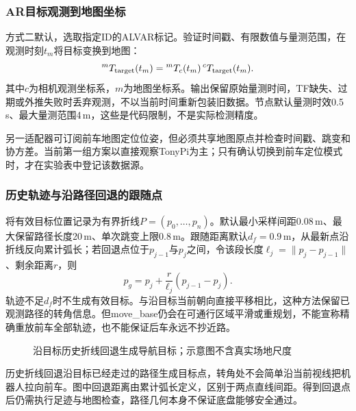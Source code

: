 \subsubsection{AR目标观测到地图坐标}
方式二默认，选取指定ID的ALVAR标记。验证时间戳、有限数值与量测范围，在观测时刻$t_m$将目标变换到地图：
\begin{equation}
{}^{m}T_{\rm target}(t_m)
={}^mT_c(t_m)\,{}^cT_{\rm target}(t_m).
\end{equation}
其中$c$为相机观测坐标系，$m$为地图坐标系。输出保留原始量测时间，TF缺失、过期或外推失败时丢弃观测，不以当前时间重新包装旧数据。节点默认量测时效0.5\,s、最大量测范围4\,m，这些是代码限制，不是实际检测精度。

另一适配器可订阅前车地图定位位姿，但必须共享地图原点并检查时间戳、跳变和协方差。当前第一组方案以直接观察TonyPi为主；只有确认切换到前车定位模式时，才在实验表中登记该数据源。

\subsubsection{历史轨迹与沿路径回退的跟随点}
将有效目标位置记录为有界折线$P=(p_0,\dots,p_n)$。默认最小采样间距0.08\,m、最大保留路径长度20\,m、单次跳变上限0.8\,m。跟随距离默认$d_f=0.9$\,m，从最新点沿折线反向累计弧长；若回退点位于$p_{j-1}$与$p_j$之间，令该段长度$\ell_j=\|p_j-p_{j-1}\|$、剩余距离$r$，则
\begin{equation}
p_g=p_j+\frac{r}{\ell_j}(p_{j-1}-p_j).
\end{equation}
轨迹不足$d_f$时不生成有效目标。与沿目标当前朝向直接平移相比，这种方法保留已观测路径的转角信息。但move\_base仍会在可通行区域平滑或重规划，不能宣称精确重放前车全部轨迹，也不能保证后车永远不抄近路。
\begin{figure}[H]\centering

\caption{沿目标历史折线回退生成导航目标；示意图不含真实场地尺度}
\end{figure}

历史折线回退沿目标已经走过的路径生成目标点，转角处不会简单沿当前视线把机器人拉向前车。图中回退距离由累计弧长定义，区别于两点直线间距。得到回退点后仍需执行足迹与地图检查，路径几何本身不保证底盘能够安全通过。


